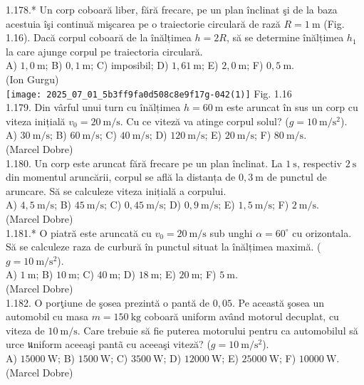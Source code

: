 1.178.* Un corp coboară liber, fără frecare, pe un plan înclinat şi de la baza acestuia îşi continuă mişcarea pe o traiectorie circulară de rază $R=1 \mathrm{~m}$ (Fig. 1.16). Dacă corpul coboară de la înălțimea $h=2 R$, să se determine înălțimea $h_{1}$ la care ajunge corpul pe traiectoria circulară.\\ A) $1,0 \mathrm{~m}$; B) $0,1 \mathrm{~m}$; C) imposibil; D) $1,61 \mathrm{~m}$; E) $2,0 \mathrm{~m}$; F) $0,5 \mathrm{~m}$.\\ (Ion Gurgu)\\ \texttt{[image: 2025\_07\_01\_5b3ff9fa0d508c8e9f17g-042(1)]} Fig. 1.16\\

1.179. Din vârful unui turn cu înălțimea $h=60 \mathrm{~m}$ este aruncat în sus un corp cu viteza inițială $v_{0}=20 \mathrm{~m} / \mathrm{s}$. Cu ce viteză va atinge corpul solul? ($g=10 \mathrm{~m} / \mathrm{s}^{2}$).\\ A) $30 \mathrm{~m} / \mathrm{s}$; B) $60 \mathrm{~m} / \mathrm{s}$; C) $40 \mathrm{~m} / \mathrm{s}$; D) $120 \mathrm{~m} / \mathrm{s}$; E) $20 \mathrm{~m} / \mathrm{s}$; F) $80 \mathrm{~m} / \mathrm{s}$.\\ (Marcel Dobre)\\

1.180. Un corp este aruncat fără frecare pe un plan înclinat. La $1 \mathrm{~s}$, respectiv $2 \mathrm{~s}$ din momentul aruncării, corpul se află la distanța de $0,3 \mathrm{~m}$ de punctul de aruncare. Să se calculeze viteza inițială a corpului.\\ A) $4,5 \mathrm{~m} / \mathrm{s}$; B) $45 \mathrm{~m} / \mathrm{s}$; C) $0,45 \mathrm{~m} / \mathrm{s}$; D) $0,9 \mathrm{~m} / \mathrm{s}$; E) $1,5 \mathrm{~m} / \mathrm{s}$; F) $2 \mathrm{~m} / \mathrm{s}$.\\ (Marcel Dobre)\\

1.181.* O piatră este aruncată cu $v_{0}=20 \mathrm{~m} / \mathrm{s}$ sub unghi $\alpha=60^{\circ}$ cu orizontala. Să se calculeze raza de curbură în punctul situat la înălțimea maximă. ($g=10 \mathrm{~m} / \mathrm{s}^{2}$).\\ A) $1 \mathrm{~m}$; B) $10 \mathrm{~m}$; C) $40 \mathrm{~m}$; D) $18 \mathrm{~m}$; E) $20 \mathrm{~m}$; F) $5 \mathrm{~m}$.\\ (Marcel Dobre)\\

1.182. O porţiune de şosea prezintă o pantă de $0,05$. Pe această şosea un automobil cu masa $m=150 \mathrm{~kg}$ coboară uniform având motorul decuplat, cu viteza de $10 \mathrm{~m} / \mathrm{s}$. Care trebuie să fie puterea motorului pentru ca automobilul să urce นniform aceeaşi pantã cu aceeaşi viteză? ($g=10 \mathrm{~m} / \mathrm{s}^{2}$).\\ A) $15000 \mathrm{~W}$; B) $1500 \mathrm{~W}$; C) $3500 \mathrm{~W}$; D) $12000 \mathrm{~W}$; E) $25000 \mathrm{~W}$; F) $10000 \mathrm{~W}$.\\ (Marcel Dobre)\\

